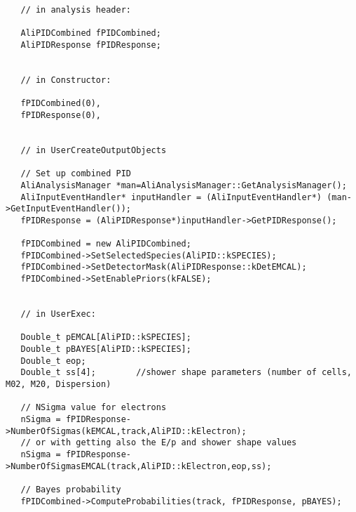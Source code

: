 \begin{DDbox}{\linewidth}
\begin{lstlisting}
   // in analysis header: 

   AliPIDCombined fPIDCombined;                                                        
   AliPIDResponse fPIDResponse;   


   // in Constructor: 

   fPIDCombined(0),                                                       
   fPIDResponse(0), 


   // in UserCreateOutputObjects 

   // Set up combined PID
   AliAnalysisManager *man=AliAnalysisManager::GetAnalysisManager();
   AliInputEventHandler* inputHandler = (AliInputEventHandler*) (man->GetInputEventHandler());
   fPIDResponse = (AliPIDResponse*)inputHandler->GetPIDResponse();

   fPIDCombined = new AliPIDCombined;
   fPIDCombined->SetSelectedSpecies(AliPID::kSPECIES);
   fPIDCombined->SetDetectorMask(AliPIDResponse::kDetEMCAL);
   fPIDCombined->SetEnablePriors(kFALSE);


   // in UserExec: 

   Double_t pEMCAL[AliPID::kSPECIES];
   Double_t pBAYES[AliPID::kSPECIES];
   Double_t eop;
   Double_t ss[4];        //shower shape parameters (number of cells, M02, M20, Dispersion)

   // NSigma value for electrons
   nSigma = fPIDResponse->NumberOfSigmas(kEMCAL,track,AliPID::kElectron);
   // or with getting also the E/p and shower shape values
   nSigma = fPIDResponse->NumberOfSigmasEMCAL(track,AliPID::kElectron,eop,ss);

   // Bayes probability
   fPIDCombined->ComputeProbabilities(track, fPIDResponse, pBAYES);  
\end{lstlisting}
\end{DDbox}

